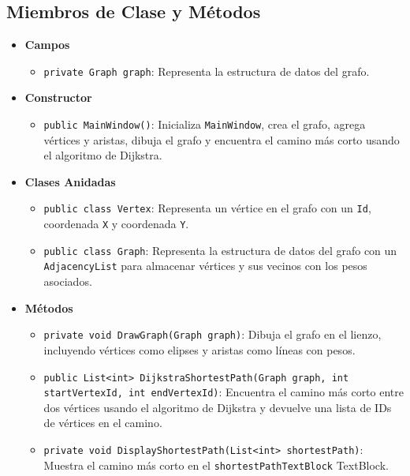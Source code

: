 \documentclass{article}
\begin{document}
\subsection{Miembros de Clase y Métodos}
\begin{itemize}
    \item \textbf{Campos}
    \begin{itemize}
        \item \texttt{private Graph graph}: Representa la estructura de datos del grafo.
    \end{itemize}
    
    \item \textbf{Constructor}
    \begin{itemize}
        \item \texttt{public MainWindow()}: Inicializa \texttt{MainWindow}, crea el grafo, agrega vértices y aristas, dibuja el grafo y encuentra el camino más corto usando el algoritmo de Dijkstra.
    \end{itemize}
    
    \item \textbf{Clases Anidadas}
    \begin{itemize}
        \item \texttt{public class Vertex}: Representa un vértice en el grafo con un \texttt{Id}, coordenada \texttt{X} y coordenada \texttt{Y}.
        
        \item \texttt{public class Graph}: Representa la estructura de datos del grafo con un \texttt{AdjacencyList} para almacenar vértices y sus vecinos con los pesos asociados.
    \end{itemize}
    
    \item \textbf{Métodos}
    \begin{itemize}
        \item \texttt{private void DrawGraph(Graph graph)}: Dibuja el grafo en el lienzo, incluyendo vértices como elipses y aristas como líneas con pesos.
        
        \item \texttt{public List<int> DijkstraShortestPath(Graph graph, int startVertexId, int endVertexId)}: Encuentra el camino más corto entre dos vértices usando el algoritmo de Dijkstra y devuelve una lista de IDs de vértices en el camino.
        
        \item \texttt{private void DisplayShortestPath(List<int> shortestPath)}: Muestra el camino más corto en el \texttt{shortestPathTextBlock} TextBlock.
    \end{itemize}
\end{itemize}
\end{document}
